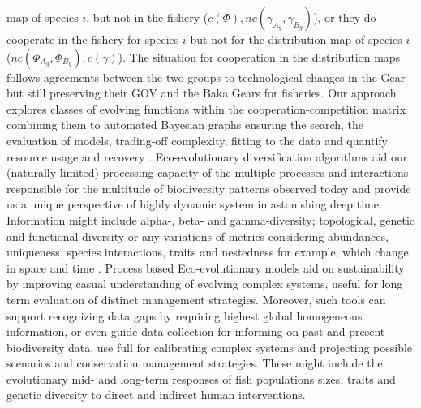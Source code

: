 \documentclass[12pt,a4paper]{article}
\begin{document}
{\begin{tcolorbox}[colback=green!5!white,colframe=green!75!black]
map of species $i$, but not in the fishery ($c(\Phi), nc(\gamma_{A_{g}},\gamma_{B_{g}})$), or they do cooperate in the fishery for species $i$ but not for the distribution map of species $i$ ($nc(\Phi_{A_{g}},\Phi_{B_{g}}), c(\gamma)$). The situation for cooperation in the distribution maps follows agreements between the two groups to technological changes in the Gear but still preserving their GOV and the Baka Gears for fisheries. Our approach explores classes of evolving functions within the cooperation-competition matrix combining them to automated Bayesian graphs ensuring the search, the evaluation of models, trading-off complexity, fitting to the data and quantify resource usage and recovery \citep{Guimera2020,Steinruecken}.
Eco-evolutionary diversification algorithms aid our (naturally-limited) processing capacity of the multiple processes and interactions responsible for the multitude of biodiversity patterns observed today \citep{Hagen2021} and provide us a unique perspective of highly dynamic system in astonishing deep time. Information might include alpha-, beta- and gamma-diversity; topological, genetic and functional diversity or any variations of metrics considering abundances, uniqueness, species interactions, traits and nestedness for example, which change in space and time \citep{Hagen2021, Pont2019}.  
Process based Eco-evolutionary models aid on sustainability by improving casual understanding of evolving complex systems, useful for long term evaluation of distinct management strategies. Moreover, such tools can support recognizing data gaps by requiring highest global homogeneous information, or even guide data collection for informing on past and present biodiversity data, use full for calibrating complex systems and projecting possible scenarios and conservation management strategies. 
These might include the evolutionary mid- and long-term responses of fish populations sizes, traits and genetic diversity to direct and indirect human interventions. 
\end{tcolorbox}}


\newpage


\end{document}
